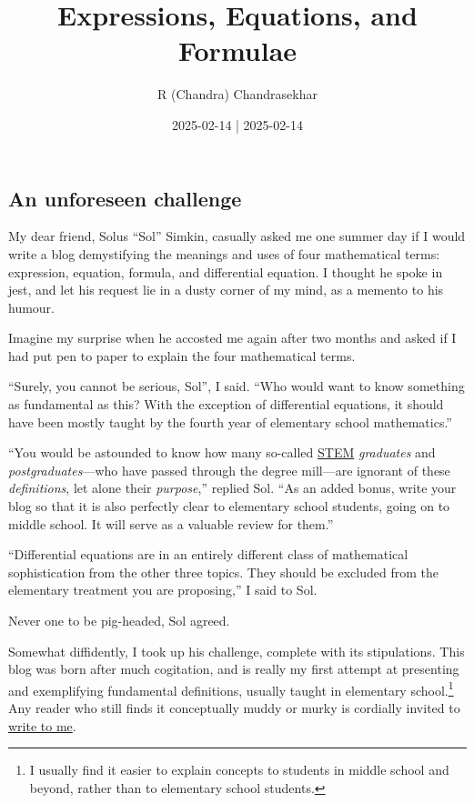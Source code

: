 \documentclass[
  a4paper,
]{article}
\title{Expressions, Equations, and Formulae}
\author{R (Chandra) Chandrasekhar}
\date{2025-02-14 | 2025-02-14}
\begin{document}
\maketitle

\thispagestyle{empty}


\subsection{An unforeseen challenge}\label{an-unforeseen-challenge}

My dear friend, Solus ``Sol'' Simkin, casually asked me one summer day
if I would write a blog demystifying the meanings and uses of four
mathematical terms: expression, equation, formula, and differential
equation. I thought he spoke in jest, and let his request lie in a dusty
corner of my mind, as a memento to his humour.

Imagine my surprise when he accosted me again after two months and asked
if I had put pen to paper to explain the four mathematical terms.

``Surely, you cannot be serious, Sol'', I said. ``Who would want to know
something as fundamental as this? With the exception of differential
equations, it should have been mostly taught by the fourth year of
elementary school mathematics.''

``You would be astounded to know how many so-called
\href{https://en.wikipedia.org/wiki/Science,_technology,_engineering,_and_mathematics}{STEM}
\emph{graduates} and \emph{postgraduates}---who have passed through the
degree mill---are ignorant of these \emph{definitions}, let alone their
\emph{purpose},'' replied Sol. ``As an added bonus, write your blog so
that it is also perfectly clear to elementary school students, going on
to middle school. It will serve as a valuable review for them.''

``Differential equations are in an entirely different class of
mathematical sophistication from the other three topics. They should be
excluded from the elementary treatment you are proposing,'' I said to
Sol.

Never one to be pig-headed, Sol agreed.

Somewhat diffidently, I took up his challenge, complete with its
stipulations. This blog was born after much cogitation, and is really my
first attempt at presenting and exemplifying fundamental definitions,
usually taught in elementary school.\footnote{I usually find it easier
  to explain concepts to students in middle school and beyond, rather
  than to elementary school students.} Any reader who still finds it
conceptually muddy or murky is cordially invited to
\href{mailto:feedback.swanlotus@gmail.com}{write to me}.
\end{document}
